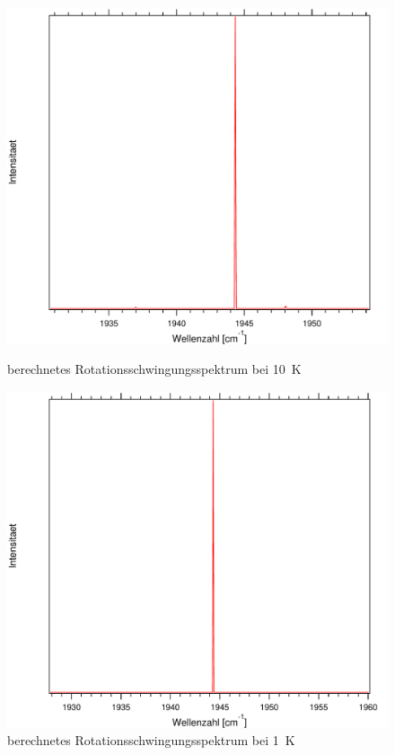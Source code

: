 \begin{figure}[H]
\centering	
	\begin{minipage}{0.47\linewidth}
	\includegraphics[width=\linewidth]{Bilder/1CO.pdf}
	\caption{berechnetes Rotationsschwingungsspektrum bei 10~K}
	\end{minipage}
\begin{minipage}{0.47\linewidth}
	\includegraphics[width=\linewidth]{Bilder/001CO.pdf}
	\caption{berechnetes Rotationsschwingungsspektrum bei 1~K}
	\end{minipage}
	
	
	
	
	\label{Rot:001CO}
\end{figure}





